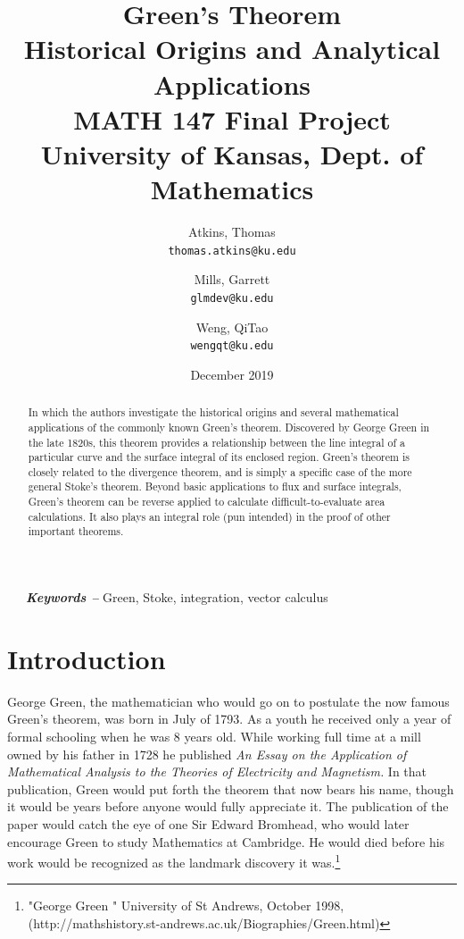 \documentclass[11pt,English]{article}
\title{
Green's Theorem\\
    \large Historical Origins and Analytical Applications\\
    \small MATH 147 Final Project\\
    \small University of Kansas, Dept. of Mathematics
}
\author{
    Atkins, Thomas\\
    \texttt{thomas.atkins@ku.edu}
    \and
    Mills, Garrett\\
    \texttt{glmdev@ku.edu}
    \and
    Weng, QiTao\\
    \texttt{wengqt@ku.edu}
}
\date{December 2019}
\providecommand{\keywords}[1]
{
  \small	
  \-\ \-\ \-\ \textbf{\textit{Keywords --}} #1
}
\begin{document}
\maketitle
\begin{abstract}
    In which the authors investigate the historical origins and several mathematical applications of the commonly known Green's theorem. Discovered by George Green in the late 1820s, this theorem provides a relationship between the line integral of a particular curve and the surface integral of its enclosed region. Green's theorem is closely related to the divergence theorem, and is simply a specific case of the more general Stoke's theorem. Beyond basic applications to flux and surface integrals, Green's theorem can be reverse applied to calculate difficult-to-evaluate area calculations. It also plays an integral role (pun intended) in the proof of other important theorems.
\end{abstract}

\keywords{Green, Stoke, integration, vector calculus}

\section{Introduction}

George Green, the mathematician who would go on to postulate the now famous Green's theorem, was born in July of 1793. As a youth he received only a year of formal schooling when he was 8 years old. While working full time at a mill owned by his father in 1728 he published \emph{An Essay on the Application of Mathematical Analysis to the Theories of Electricity and Magnetism.} In that publication, Green would put forth the theorem that now bears his name, though it would be years before anyone would fully appreciate it. The publication of the paper would catch the eye of one Sir Edward Bromhead, who would later encourage Green to study Mathematics at Cambridge. He would died before his work would be recognized as the landmark discovery it was.\footnote{"George Green
" University of St Andrews, October 1998, (http://mathshistory.st-andrews.ac.uk/Biographies/Green.html)}
\end{document}
